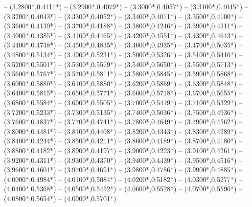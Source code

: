 {	-- ({3.2800*\dx},{0.4111*\dy})
	-- ({3.2900*\dx},{0.4079*\dy})
	-- ({3.3000*\dx},{0.4057*\dy})
	-- ({3.3100*\dx},{0.4045*\dy})
	-- ({3.3200*\dx},{0.4043*\dy})
	-- ({3.3300*\dx},{0.4052*\dy})
	-- ({3.3400*\dx},{0.4071*\dy})
	-- ({3.3500*\dx},{0.4100*\dy})
	-- ({3.3600*\dx},{0.4139*\dy})
	-- ({3.3700*\dx},{0.4188*\dy})
	-- ({3.3800*\dx},{0.4246*\dy})
	-- ({3.3900*\dx},{0.4311*\dy})
	-- ({3.4000*\dx},{0.4385*\dy})
	-- ({3.4100*\dx},{0.4465*\dy})
	-- ({3.4200*\dx},{0.4551*\dy})
	-- ({3.4300*\dx},{0.4643*\dy})
	-- ({3.4400*\dx},{0.4738*\dy})
	-- ({3.4500*\dx},{0.4835*\dy})
	-- ({3.4600*\dx},{0.4935*\dy})
	-- ({3.4700*\dx},{0.5035*\dy})
	-- ({3.4800*\dx},{0.5134*\dy})
	-- ({3.4900*\dx},{0.5231*\dy})
	-- ({3.5000*\dx},{0.5326*\dy})
	-- ({3.5100*\dx},{0.5416*\dy})
	-- ({3.5200*\dx},{0.5501*\dy})
	-- ({3.5300*\dx},{0.5579*\dy})
	-- ({3.5400*\dx},{0.5650*\dy})
	-- ({3.5500*\dx},{0.5713*\dy})
	-- ({3.5600*\dx},{0.5767*\dy})
	-- ({3.5700*\dx},{0.5811*\dy})
	-- ({3.5800*\dx},{0.5845*\dy})
	-- ({3.5900*\dx},{0.5868*\dy})
	-- ({3.6000*\dx},{0.5880*\dy})
	-- ({3.6100*\dx},{0.5880*\dy})
	-- ({3.6200*\dx},{0.5869*\dy})
	-- ({3.6300*\dx},{0.5848*\dy})
	-- ({3.6400*\dx},{0.5815*\dy})
	-- ({3.6500*\dx},{0.5771*\dy})
	-- ({3.6600*\dx},{0.5718*\dy})
	-- ({3.6700*\dx},{0.5655*\dy})
	-- ({3.6800*\dx},{0.5584*\dy})
	-- ({3.6900*\dx},{0.5505*\dy})
	-- ({3.7000*\dx},{0.5419*\dy})
	-- ({3.7100*\dx},{0.5329*\dy})
	-- ({3.7200*\dx},{0.5233*\dy})
	-- ({3.7300*\dx},{0.5135*\dy})
	-- ({3.7400*\dx},{0.5036*\dy})
	-- ({3.7500*\dx},{0.4936*\dy})
	-- ({3.7600*\dx},{0.4837*\dy})
	-- ({3.7700*\dx},{0.4741*\dy})
	-- ({3.7800*\dx},{0.4649*\dy})
	-- ({3.7900*\dx},{0.4562*\dy})
	-- ({3.8000*\dx},{0.4481*\dy})
	-- ({3.8100*\dx},{0.4408*\dy})
	-- ({3.8200*\dx},{0.4343*\dy})
	-- ({3.8300*\dx},{0.4289*\dy})
	-- ({3.8400*\dx},{0.4244*\dy})
	-- ({3.8500*\dx},{0.4211*\dy})
	-- ({3.8600*\dx},{0.4189*\dy})
	-- ({3.8700*\dx},{0.4180*\dy})
	-- ({3.8800*\dx},{0.4182*\dy})
	-- ({3.8900*\dx},{0.4197*\dy})
	-- ({3.9000*\dx},{0.4223*\dy})
	-- ({3.9100*\dx},{0.4261*\dy})
	-- ({3.9200*\dx},{0.4311*\dy})
	-- ({3.9300*\dx},{0.4370*\dy})
	-- ({3.9400*\dx},{0.4439*\dy})
	-- ({3.9500*\dx},{0.4516*\dy})
	-- ({3.9600*\dx},{0.4601*\dy})
	-- ({3.9700*\dx},{0.4691*\dy})
	-- ({3.9800*\dx},{0.4786*\dy})
	-- ({3.9900*\dx},{0.4885*\dy})
	-- ({4.0000*\dx},{0.4984*\dy})
	-- ({4.0100*\dx},{0.5084*\dy})
	-- ({4.0200*\dx},{0.5182*\dy})
	-- ({4.0300*\dx},{0.5277*\dy})
	-- ({4.0400*\dx},{0.5368*\dy})
	-- ({4.0500*\dx},{0.5452*\dy})
	-- ({4.0600*\dx},{0.5528*\dy})
	-- ({4.0700*\dx},{0.5596*\dy})
	-- ({4.0800*\dx},{0.5654*\dy})
	-- ({4.0900*\dx},{0.5701*\dy})
}
